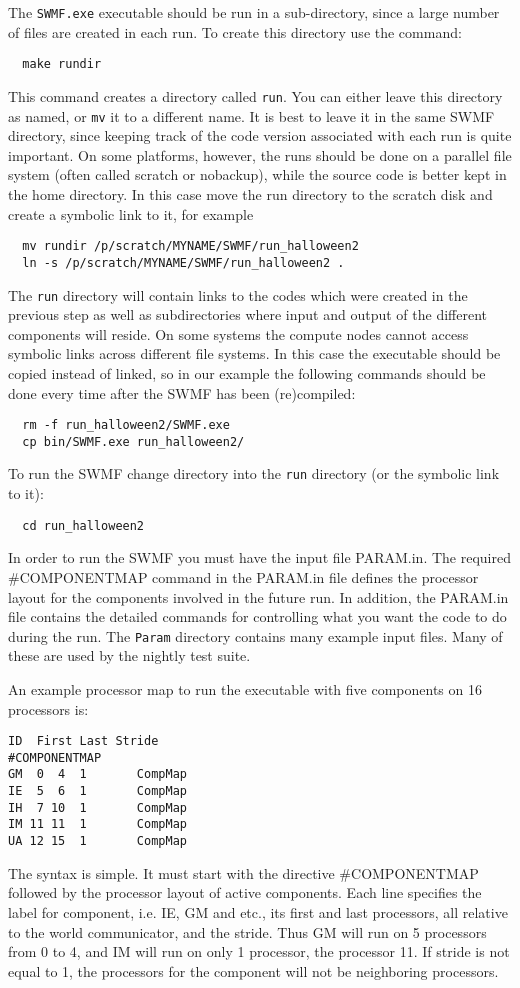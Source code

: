 The {\tt SWMF.exe} executable should be run in a sub-directory, 
since a large number of files are created in each run.  
To create this directory use the command:
\begin{verbatim}
  make rundir
\end{verbatim} 
This command creates a directory called {\tt run}.  You can either
leave this directory as named, or {\tt mv} it to a different name.  It
is best to leave it in the same SWMF directory, since
keeping track of the code version associated with each run is quite
important. On some platforms, however, the runs should be done on a
parallel file system (often called scratch or nobackup), while the
source code is better kept in the home directory. In this case move
the run directory to the scratch disk and create a symbolic link to it, 
for example
\begin{verbatim}
  mv rundir /p/scratch/MYNAME/SWMF/run_halloween2
  ln -s /p/scratch/MYNAME/SWMF/run_halloween2 .
\end{verbatim}
The {\tt run} directory will contain links to the codes
which were created in the previous step as well as subdirectories
where input and output of the different components will reside.
On some systems the compute nodes cannot access symbolic links
across different file systems. In this case the executable should be 
copied instead of linked, so in our example the following commands
should be done every time after the SWMF has been (re)compiled:
\begin{verbatim}
  rm -f run_halloween2/SWMF.exe
  cp bin/SWMF.exe run_halloween2/
\end{verbatim}
To run the SWMF change directory into the {\tt run} directory 
(or the symbolic link to it):
\begin{verbatim}
  cd run_halloween2
\end{verbatim}
In order to run the SWMF you must have the input file PARAM.in.
The required \#COMPONENTMAP command in the PARAM.in file defines the processor
layout for the components involved in the future run.  In addition,
the PARAM.in file contains the detailed commands for controlling what you want the
code to do during the run.  The {\tt Param} directory contains many
example input files. Many of these are used by the nightly test suite.

An example processor map to run the executable with
five components on 16 processors is:
\begin{verbatim}
ID  First Last Stride
#COMPONENTMAP
GM  0  4  1       CompMap
IE  5  6  1       CompMap
IH  7 10  1       CompMap
IM 11 11  1       CompMap
UA 12 15  1       CompMap
\end{verbatim}
The syntax is simple. It must start with the directive
\#COMPONENTMAP followed by the processor layout of active components.
Each line specifies the label for component, i.e. IE, GM and
etc., its first and last processors, all relative to the world
communicator, and the stride. Thus GM will run on 5 processors from 0
to 4, and IM will run on only 1 processor, the processor 11.  If
stride is not equal to 1, the processors for the component will not be
neighboring processors.

